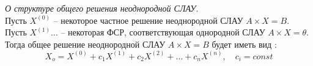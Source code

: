 \begin{theorem}
  \textit{О структуре общего решения неоднородной СЛАУ}. \\ 
  Пусть $X^{(0)}$ -- некоторое частное решение неоднородной СЛАУ  $A \times X = B$.
  Пусть  $X^{(1)} \ldots$ -- некоторая ФСР, соответствующая однородной СЛАУ $A \times X=\theta$.
  Тогда общее решение неоднородной СЛАУ $A \times X = B$ будет иметь вид :  \[
    X_o = X^{(0)} + c_1 X^{(1)} + c_2 X^{(2)} + \ldots + c_n X^{(n)}, \quad c_i = const
  \] 
\end{theorem}

